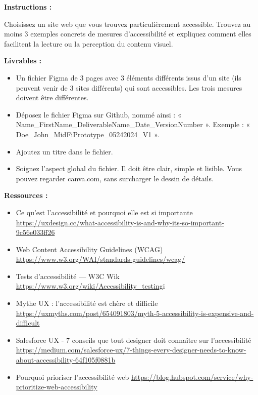 \makeheaderfiles

\textbf{Instructions :}

Choisissez un site web que vous trouvez particulièrement accessible. Trouvez au moins 3 exemples concrets de mesures d'accessibilité et expliquez comment elles facilitent la lecture ou la perception du contenu visuel.

\textbf{Livrables :}

\begin{itemize}
\item Un fichier Figma de 3 pages avec 3 éléments différents issus d'un site (ils peuvent venir de 3 sites différents) qui sont accessibles. Les trois mesures doivent être différentes.
\item Déposez le fichier Figma sur Github, nommé ainsi : « Name\_FirstName\_DeliverableName\_Date\_VersionNumber ». Exemple : « Doe\_John\_MidFiPrototype\_05242024\_V1 ».
\item Ajoutez un titre dans le fichier.
\item Soignez l'aspect global du fichier. Il doit être clair, simple et lisible. Vous pouvez regarder canva.com, sans surcharger le dessin de détails.
\end{itemize}

\textbf{Ressources :}

\begin{itemize}
\item Ce qu'est l'accessibilité et pourquoi elle est si importante \url{https://uxdesign.cc/what-accessibility-is-and-why-its-so-important-9c56e033ff26}
\item Web Content Accessibility Guidelines (WCAG) \url{https://www.w3.org/WAI/standards-guidelines/wcag/}
\item Tests d'accessibilité  ---  W3C Wik \url{https://www.w3.org/wiki/Accessibility_testing}i
\item Mythe UX : l'accessibilité est chère et difficile \url{https://uxmyths.com/post/654091803/myth-5-accessibility-is-expensive-and-difficult}
\item Salesforce UX - 7 conseils que tout designer doit connaître sur l'accessibilité \url{https://medium.com/salesforce-ux/7-things-every-designer-needs-to-know-about-accessibility-64f105f0881b}
\item Pourquoi prioriser l'accessibilité web \url{https://blog.hubspot.com/service/why-prioritize-web-accessibility}
\end{itemize}

